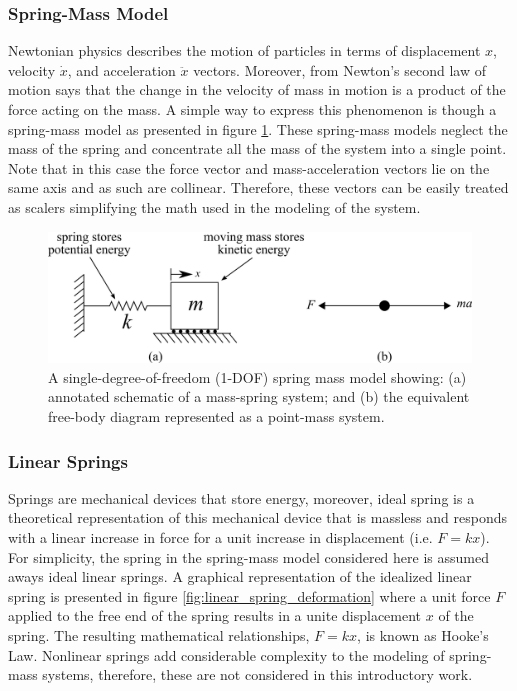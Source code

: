 \documentclass[12pt,letter]{article}
\begin{document}
		\subsubsection{Spring-Mass Model}

							
            Newtonian physics describes the motion of particles in terms of displacement $x$, velocity $\dot{x}$, and acceleration $\ddot{x}$ vectors. Moreover, from Newton's second law of motion says that the change in the velocity of mass in motion is a product of the force acting on the mass. A simple way to express this phenomenon is though a spring-mass model as presented in figure  \ref{fig:spring_mass_model_with_point_mass}. These spring-mass models neglect the mass of the spring and concentrate all the mass of the system into a single point. Note that in this case the force vector and mass-acceleration vectors lie on the same axis and as such are collinear. Therefore, these vectors can be easily treated as scalers simplifying the math used in the modeling of the system.     

			\begin{figure}[H]
				\centering
				\includegraphics[]{../figures/spring_mass_model_with_point_mass.png}
				\caption{A single-degree-of-freedom (1-DOF) spring mass model showing: (a) annotated schematic of a mass-spring system; and (b) the equivalent free-body diagram represented as a point-mass system.}
				\label{fig:spring_mass_model_with_point_mass}
			\end{figure}	
		
		\subsubsection{Linear Springs}
	
            Springs are mechanical devices that store energy, moreover, ideal spring is a theoretical representation of this mechanical device that is massless and responds with a linear increase in force for a unit increase in displacement (i.e. $F=kx$). For simplicity, the spring in the spring-mass model considered here is assumed aways ideal linear springs. A graphical representation of the idealized linear spring is presented in figure \ref{fig:linear_spring_deformation} where a unit force $F$ applied to the free end of the spring results in a unite displacement $x$ of the spring.  The resulting mathematical relationships,  $F=kx$, is known as Hooke's Law. Nonlinear springs add considerable complexity to the modeling of spring-mass systems, therefore, these are not considered in this introductory work. 
			
\end{document}
